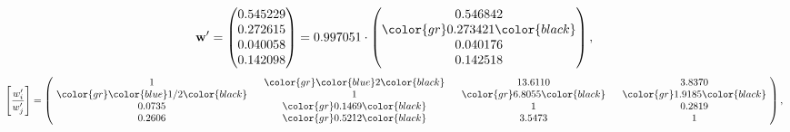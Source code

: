 \begin{example}
\begin{equation*}
\mathbf{w}^{\prime} =
\begin{pmatrix}
0.545229\\
0.272615\\
0.040058\\
0.142098
\end{pmatrix} =
0.997051\cdot
\begin{pmatrix}
0.546842\\
\color{gr} 0.273421\color{black} \\
0.040176\\
0.142518
\end{pmatrix},
\end{equation*}
\begin{equation*}
\left[ \frac{{w}^{\prime}_i}{{w}^{\prime}_j} \right] =
\begin{pmatrix}
$\,\,$ 1 $\,\,$ & $\,\,$\color{gr} \color{blue} 2\color{black} $\,\,$ & $\,\,$13.6110$\,\,$ & $\,\,$3.8370$\,\,$ \\
$\,\,$\color{gr} \color{blue}  1/2\color{black} $\,\,$ & $\,\,$ 1 $\,\,$ & $\,\,$\color{gr} 6.8055\color{black} $\,\,$ & $\,\,$\color{gr} 1.9185\color{black}   $\,\,$ \\
$\,\,$0.0735$\,\,$ & $\,\,$\color{gr} 0.1469\color{black} $\,\,$ & $\,\,$ 1 $\,\,$ & $\,\,$0.2819 $\,\,$ \\
$\,\,$0.2606$\,\,$ & $\,\,$\color{gr} 0.5212\color{black} $\,\,$ & $\,\,$3.5473$\,\,$ & $\,\,$ 1  $\,\,$ \\
\end{pmatrix},
\end{equation*}
\end{example}
\newpage
